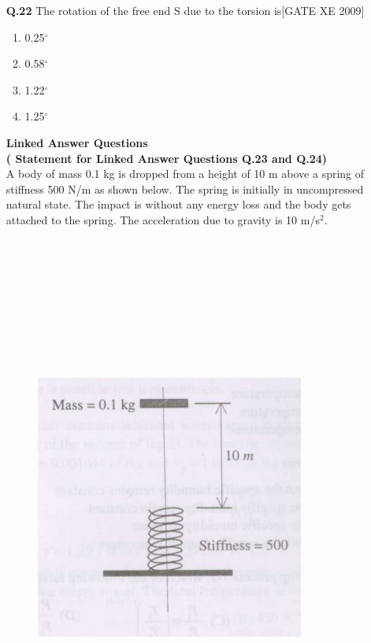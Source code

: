 \documentclass[journal,12pt,onecolumn]{IEEEtran}
\theoremstyle{remark}
\begin{document}
\begin{enumerate}
\item[ \textbf{Q.22}] The rotation of the free end S due to the torsion is\hfill[GATE XE 2009]
\begin{multicols}{2}
\begin{enumerate}
    \item 0.25$^\circ$
    \item 0.58$^\circ$
    \item 1.22$^\circ$
    \item 1.25$^\circ$
\end{enumerate}
\end{multicols}

\vspace{0.3cm}



\Large\textbf{ Linked Answer Questions}\\
 \textbf{( Statement for Linked Answer Questions Q.23 and Q.24)}  \\

A body of mass 0.1 kg is dropped from a height of 10 m above a spring of stiffness 500 N/m as shown below. The spring is initially in uncompressed natural state. The impact is without any energy loss and the body gets attached to the spring. The acceleration due to gravity is 10 m/s$^2$.\\\\\\\\\\\\\\\\\\\

\begin{figure} [h]
    \centering
     \includegraphics[width=0.5\columnwidth]{figs/fig26.png}
       
\end{figure}


\end{enumerate}
\end{document}
